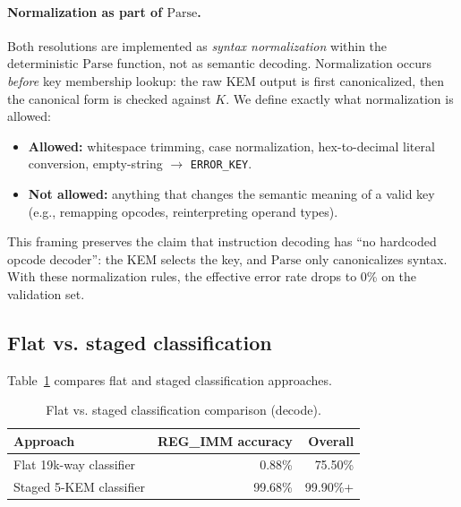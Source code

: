 \documentclass[11pt]{article}
\begin{document}
\paragraph{Normalization as part of $\mathrm{Parse}$.}
Both resolutions are implemented as \emph{syntax normalization} within the deterministic $\mathrm{Parse}$ function, not as semantic decoding.
Normalization occurs \emph{before} key membership lookup: the raw KEM output is first canonicalized, then the canonical form is checked against $K$.
We define exactly what normalization is allowed:
\begin{itemize}[leftmargin=*]
  \item \textbf{Allowed:} whitespace trimming, case normalization, hex-to-decimal literal conversion, empty-string $\rightarrow$ \texttt{ERROR\_KEY}.
  \item \textbf{Not allowed:} anything that changes the semantic meaning of a valid key (e.g., remapping opcodes, reinterpreting operand types).
\end{itemize}
This framing preserves the claim that instruction decoding has ``no hardcoded opcode decoder'': the KEM selects the key, and $\mathrm{Parse}$ only canonicalizes syntax.
With these normalization rules, the effective error rate drops to 0\% on the validation set.

\subsection{Flat vs. staged classification}
Table~\ref{tab:flat_vs_staged} compares flat and staged classification approaches.

\begin{table}[h]
\centering
\caption{Flat vs. staged classification comparison (decode).}
\label{tab:flat_vs_staged}
\begin{tabular}{lrr}
\toprule
Approach & REG\_IMM accuracy & Overall \\
\midrule
Flat 19k-way classifier & 0.88\% & 75.50\% \\
Staged 5-KEM classifier & 99.68\% & 99.90\%+ \\
\bottomrule
\end{tabular}
\end{table}
\end{document}
